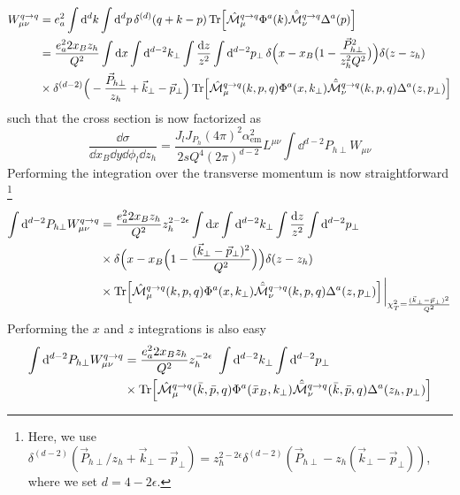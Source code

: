 \begin{equation}
\begin{aligned}
     W_{\mu\nu}^{q \to q}&=e_a^2\int\dd^d k\int \dd^{d}p\,\delta^{(d)}(q+k-p)\Tr[\hat{\mathcal{M}}_\mu^{q\to q} \Phi^a(k)\hat{\bar{\mathcal{M}}}_\nu^{q\to q}\Delta^a(p)]\\
     &=\frac{e_a^22x_B z_h}{Q^2}\int\dd x \int \dd^{d-2}k_\perp\int \frac{\dd z}{z^2}\int \dd^{d-2}p_\perp\, \delta\Big(x-x_B\big(1-\frac{\vec P^2_{h\perp}}{z_h^2Q^2}\big)\Big)\delta(z-z_h)\\
    &\times\delta^{(d-2)}\Big(-\frac{\vec P_{h\perp}}{z_h}+\vec k_\perp-\vec p_\perp\Big)\Tr[\hat{\mathcal{M}}_\mu^{q\to q}(k,p,q) \Phi^a(x, k_\perp)\hat{\bar{\mathcal{M}}}_\nu^{q\to q}(k,p,q) \Delta^a(z,p_\perp)]
\end{aligned}
\end{equation} 
such that the cross section is now factorized as
\begin{equation}\boxed{
    \frac{\dd \sigma}{\dd x_B \dd y \dd \phi_l\dd z_h } = \frac{ J_lJ_{P_h}(4\pi)^2\alpha_{\text{em}}^2}{2sQ^4(2\pi)^{d-2}}L^{\mu\nu} \int\dd^{d-2}P_{h\perp} W_{\mu\nu}}
\end{equation}
Performing the integration over the transverse momentum is now straightforward \footnote{Here, we use $\delta^{(d-2)}(\vec P_{h\perp}/z_h +\vec k_\perp-\vec p_\perp)=z_h^{2-2\epsilon}\delta^{(d-2)}(\vec P_{h\perp} - z_h (\vec k_\perp-\vec p_\perp))$, where we set $d=4-2\epsilon$.}
\begin{equation}
    \begin{aligned}
         \int\dd^{d-2}P_{h\perp} W_{\mu\nu}^{q \to q} &= \frac{e_a^22x_B z_h}{Q^2}z_h^{2-2\epsilon}\int \dd x \int \dd^{d-2}k_\perp\int \frac{\dd z}{z^2} \int \dd^{d-2}p_\perp \,\\
        &\times\delta\Big(x-x_B\Big(1-\frac{(\vec k_\perp - \vec p_\perp)^2}{Q^2}\Big)\Big)\delta(z-z_h)\\&\times \Tr[\hat{\mathcal{M}}_\mu^{q\to q}(k,p,q) \Phi^a(x,k_\perp)\hat{\bar{\mathcal{M}}}_\nu^{q\to q}(k,p,q)\Delta^a(z,p_\perp)]\eval_{\chi_T^2=\frac{(\vec k_\perp - \vec p_\perp)^2}{Q^2}}
    \end{aligned}
\end{equation}
Performing the $x$ and $z$ integrations is also easy 
\begin{equation}
\begin{aligned}
         \int\dd^{d-2}P_{h\perp} W_{\mu\nu}^{q \to q} &=\frac{e_a^22x_B z_h}{Q^2}z_h^{-2\epsilon}\ \int \dd^{d-2}k_\perp\int \dd^{d-2}p_\perp \\
         &\times\Tr[\hat{\mathcal{M}}_\mu^{q\to q}(\bar k,\bar p,q) \Phi^a(\bar x_B,k_\perp)\hat{\bar{\mathcal{M}}}_\nu^{q\to q}(\bar k,\bar p,q)\Delta^a(z_h,p_\perp)]
    \end{aligned}
\end{equation}
